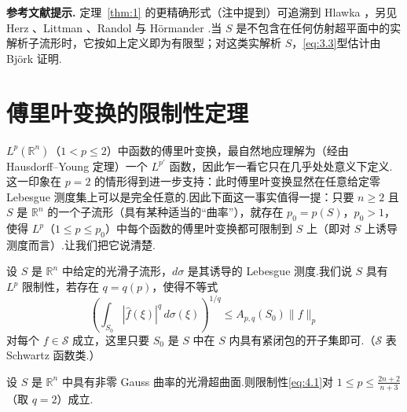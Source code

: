 \documentclass[
  BookTitleCN={傅里叶分析中的振动积分},
  BookTitleEN={Oscillatory Integrals in Fourier Analysis},
  OriginalAuthor={E.~M. Stein},
  OriginalEdition={Proc. Sympos. Pure Math. 35, Part~1},
  OriginalPublisher={American Mathematical Society},
  OriginalYear={1979},
  Translator={翻译及重排},
  ModelUsed={Codex CLI},
  Biblatex=false,
  TranslationDate={2026年8月27日}
]{mathtranslation}
\numberwithin{equation}{chapter}   %
\newcommand{\R}{\mathbb{R}}
\begin{document}
\noindent\textbf{参考文献提示.} 定理~\ref{thm:1} 的更精确形式（注中提到）可追溯到 Hlawka \cite{ref14}，另见 Herz \cite{ref13}、Littman \cite{ref18}、Randol \cite{ref25} 与 H\"ormander \cite{ref16}.当 $S$ 是不包含在任何仿射超平面中的实解析子流形时，它按如上定义即为有限型；对这类实解析 $S$，\eqref{eq:3.3}型估计由 Bj\"ork \cite{ref2} 证明.
\chapter{傅里叶变换的限制性定理}

\noindent $L^{p}(\R^{n})$（$1<p\leq2$）中函数的傅里叶变换，最自然地应理解为（经由 Hausdorff--Young 定理）一个 $L^{p'}$ 函数，因此乍一看它只在几乎处处意义下定义.这一印象在 $p=2$ 的情形得到进一步支持：此时傅里叶变换显然在任意给定零 Lebesgue 测度集上可以是完全任意的.因此下面这一事实值得一提：只要 $n\geq2$ 且 $S$ 是 $\R^{n}$ 的一个子流形（具有某种适当的``曲率''），就存在 $p_{0}=p(S)$，$p_{0}>1$，使得 $L^{p}$（$1\leq p\leq p_{0}$）中每个函数的傅里叶变换都可限制到 $S$ 上（即对 $S$ 上诱导测度而言）.让我们把它说清楚.

\noindent 设 $S$ 是 $\R^{n}$ 中给定的光滑子流形，$d\sigma$ 是其诱导的 Lebesgue 测度.我们说 $S$ 具有 $L^{p}$ 限制性，若存在 $q=q(p)$，使得不等式
\begin{equation}
  \left(\int_{S_{0}}|\hat{f}(\xi)|^{q}\,d\sigma(\xi)\right)^{1/q}\leq A_{p,q}(S_{0})\|f\|_{p} \label{eq:4.1}
\end{equation}
对每个 $f\in\mathcal{S}$ 成立，这里只要 $S_{0}$ 是 $S$ 中在 $S$ 内具有紧闭包的开子集即可.（$\mathcal{S}$ 表 Schwartz 函数类.）

\begin{theorem}\label{thm:3}
  设 $S$ 是 $\R^{n}$ 中具有非零 Gauss 曲率的光滑超曲面.则限制性\eqref{eq:4.1}对 $1\leq p\leq\frac{2n+2}{n+3}$（取 $q=2$）成立.
\end{theorem}
\end{document}
